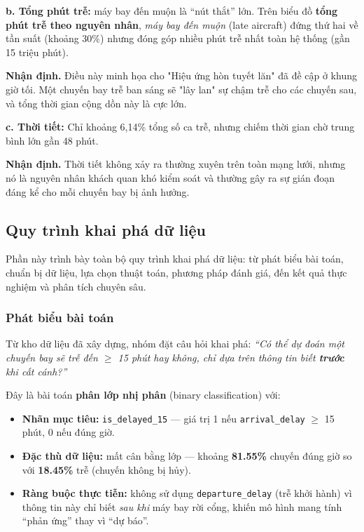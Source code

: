 \noindent \textbf{b. Tổng phút trễ:} máy bay đến muộn là ``nút thắt'' lớn.
Trên biểu đồ \textbf{tổng phút trễ theo nguyên nhân}, \textit{máy bay đến muộn} (late aircraft) đứng thứ hai về tần suất (khoảng 30\%) nhưng đóng góp nhiều phút trễ nhất toàn hệ thống (gần 15 triệu phút).

\noindent\textbf{Nhận định.}
Điều này minh họa cho "Hiệu ứng hòn tuyết lăn" đã đề cập ở khung giờ tối. Một chuyến bay trễ ban sáng sẽ "lây lan" sự chậm trễ cho các chuyến sau, và tổng thời gian cộng dồn này là cực lớn.

\noindent \textbf{c. Thời tiết:} Chỉ khoảng 6{,}14\% tổng số ca trễ, nhưng chiếm thời gian chờ trung bình lớn gần 48 phút.

\noindent\textbf{Nhận định.}
Thời tiết không xảy ra thường xuyên trên toàn mạng lưới, nhưng nó là nguyên nhân khách quan khó kiểm soát và thường gây ra sự gián đoạn đáng kể cho mỗi chuyến bay bị ảnh hưởng.

\subsection{Quy trình khai phá dữ liệu}
\label{subsec:chap4_mining}

Phần này trình bày toàn bộ quy trình khai phá dữ liệu: từ phát biểu bài toán,
chuẩn bị dữ liệu, lựa chọn thuật toán, phương pháp đánh giá,
đến kết quả thực nghiệm và phân tích chuyên sâu.

\subsubsection{Phát biểu bài toán}

Từ kho dữ liệu đã xây dựng, nhóm đặt câu hỏi khai phá:
\textit{``Có thể dự đoán một chuyến bay sẽ trễ đến $\geq$ 15 phút hay không,
chỉ dựa trên thông tin biết \textbf{trước} khi cất cánh?''}

Đây là bài toán \textbf{phân lớp nhị phân} (binary classification) với:
\begin{itemize}
    \item \textbf{Nhãn mục tiêu:} \texttt{is\_delayed\_15} ---
          giá trị 1 nếu \texttt{arrival\_delay} $\geq$ 15 phút, 0 nếu đúng giờ.
    \item \textbf{Đặc thù dữ liệu:} mất cân bằng lớp ---
          khoảng \textbf{81.55\%} chuyến đúng giờ so với \textbf{18.45\%} trễ (chuyến không bị hủy).
    \item \textbf{Ràng buộc thực tiễn:} không sử dụng \texttt{departure\_delay}
          (trễ khởi hành) vì thông tin này chỉ biết \textit{sau khi} máy bay
          rời cổng, khiến mô hình mang tính ``phản ứng'' thay vì ``dự báo''.
\end{itemize}

